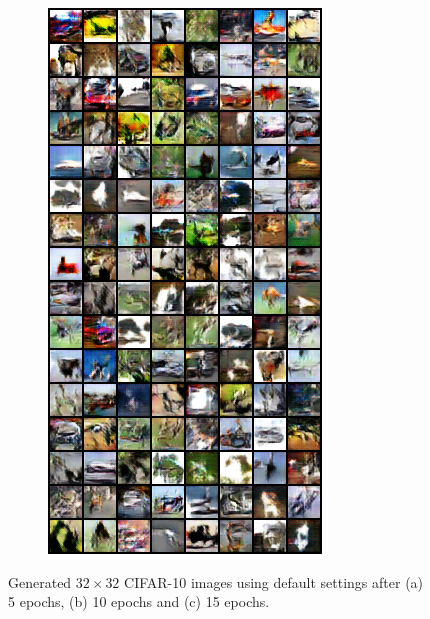 \begin{figure}[H]
    \begin{subfigure}{0.2\textwidth}
        \centering
        \includegraphics[width=0.95\linewidth]{cifar10/32/fake_sample_epoch_0015.png}
        \caption{}
        \label{subfig:cifar10/32/fake_sample_epoch_0015}
    \end{subfigure}%

    \caption{Generated $32 \times 32$ CIFAR-10 images using default settings after (a) 5 epochs, (b) 10 epochs and (c) 15 epochs.}
    \label{fig:cifar10_32_images}
\end{figure}

